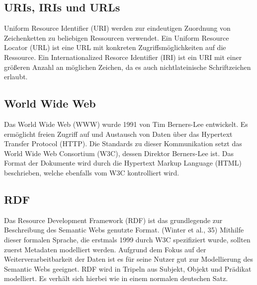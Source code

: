 \subsection{URIs, IRIs und URLs}
Uniform Resource Identifier (URI) werden zur eindeutigen Zuordnung von Zeichenketten zu beliebigen Ressourcen verwendet.
Ein Uniform Resource Locator (URL) ist eine URL mit konkreten Zugriffsmöglichkeiten auf die Ressource.
Ein Internationalized Resorce Identifier (IRI) ist ein URI mit einer größeren Anzahl an möglichen Zeichen, da es auch nichtlateinische Schriftzeichen erlaubt.

\subsection{World Wide Web}
Das World Wide Web (WWW) wurde 1991 von Tim Berners-Lee entwickelt.
Es ermöglicht freien Zugriff auf und Austausch von Daten über das Hypertext Transfer Protocol (HTTP).
Die Standards zu dieser Kommunikation setzt das World Wide Web Consortium (W3C), dessen Direktor Berners-Lee ist.
Das Format der Dokumente wird durch die Hypertext Markup Language (HTML) beschrieben, welche ebenfalls vom W3C kontrolliert wird.

\subsection{RDF}
Das Resource Development Framework (RDF) ist das grundlegende zur Beschreibung des Semantic Webs genutzte Format. (Winter et al., 35)
Mithilfe dieser formalen Sprache, die erstmals 1999 durch W3C spezifiziert wurde, sollten zuerst Metadaten modelliert werden.
Aufgrund dem Fokus auf der Weiterverarbeitbarkeit der Daten ist es für seine Nutzer gut zur Modellierung des Semantic Webs geeignet.
RDF wird in Tripeln aus Subjekt, Objekt und Prädikat modelliert. Es verhält sich hierbei wie in einem normalen deutschen Satz.

